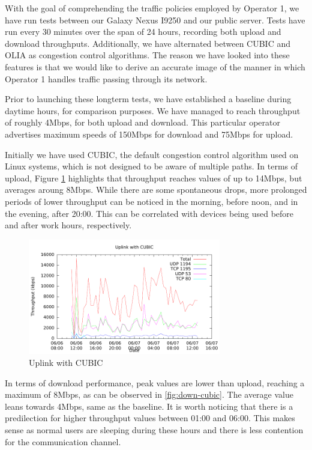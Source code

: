 With the goal of comprehending the traffic policies employed by Operator 1, we
have run tests between our Galaxy Nexus I9250 and our public server. Tests
have run every 30 minutes over the span of 24 hours, recording both upload and
download throughputs. Additionally, we have alternated between CUBIC and OLIA
as congestion control algorithms. The reason we have looked into these
features is that we would like to derive an accurate image of the manner in
which Operator 1 handles traffic passing through its network.

Prior to launching these longterm tests, we have established a baseline during
daytime hours, for comparison purposes. We have managed to reach throughput of
roughly 4Mbps, for both upload and download. This particular operator
advertises maximum speeds of 150Mbps for download and 75Mbps for upload.

Initially we have used CUBIC, the default congestion control algorithm used
on Linux systems, which is not designed to be aware of multiple paths. In
terms of upload, Figure \ref{fig:up-cubic} highlights that throughput reaches values
of up to 14Mbps, but averages aroung 8Mbps. While there are some spontaneous
drops, more prolonged periods of lower throughput can be noticed in the
morning, before noon, and in the evening, after 20:00. This can be correlated
with devices being used before and after work hours, respectively.

\begin{figure}[H]
  \centering
  \includegraphics[width=0.75\textwidth]{img/up-cubic}
  \caption{Uplink with CUBIC}
  \label{fig:up-cubic}
\end{figure}

In terms of download performance, peak values are lower than upload, reaching
a maximum of 8Mbps, as can be observed in \ref{fig:down-cubic}. The average
value leans towards 4Mbps, same as the baseline. It is worth noticing that there
is a predilection for higher throughput values between 01:00 and 06:00. This
makes sense as normal users are sleeping during these hours and there is less
contention for the communication channel.


